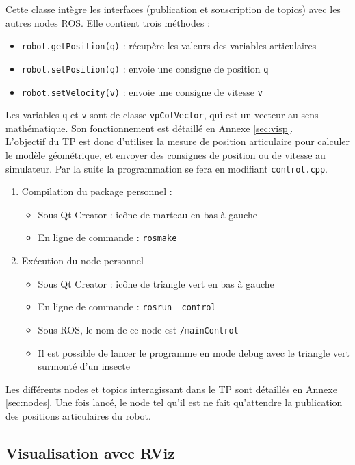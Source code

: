 \documentclass[12pt,a4paper]{article}
\def\vpV{\texttt{vpColVector}}
\begin{document}
Cette classe intègre les interfaces (publication et souscription de topics) avec les autres nodes ROS. Elle contient trois méthodes :
\begin{itemize}
 \item \texttt{robot.getPosition(q)} : récupère les valeurs des variables articulaires
 \item \texttt{robot.setPosition(q)} : envoie une consigne de position \texttt{q}
 \item \texttt{robot.setVelocity(v)} : envoie une consigne de vitesse \texttt{v}
\end{itemize}
Les variables \texttt{q} et \texttt{v} sont de classe \vpV, qui est un vecteur au sens mathématique. Son fonctionnement est détaillé en Annexe \ref{sec:visp}. \\

L'objectif du TP est donc d'utiliser la mesure de position articulaire pour calculer le modèle géométrique, et envoyer des consignes de position ou de vitesse au simulateur. Par la suite la programmation se fera en modifiant \texttt{control.cpp}.

\begin{enumerate}
  \item Compilation du package personnel : 
  \begin{itemize}
   \item Sous Qt Creator : icône de marteau en bas à gauche
   \item En ligne de commande : \texttt{rosmake \bin}
   \end{itemize}
     \item Exécution du node personnel
  \begin{itemize}
  \item Sous Qt Creator : icône de triangle vert en bas à gauche
  \item En ligne de commande :  \texttt{rosrun \bin~control}
   \item Sous ROS, le nom de ce node est \texttt{/mainControl}
   \item Il est possible de lancer le programme en mode debug avec le triangle vert surmonté d'un insecte
  \end{itemize}
\end{enumerate}

Les différents nodes et topics interagissant dans le TP sont détaillés en Annexe \ref{sec:nodes}.
Une fois lancé, le node tel qu'il est ne fait qu'attendre la publication des positions articulaires du robot.


\subsection{Visualisation avec RViz} 
  
\end{document}
